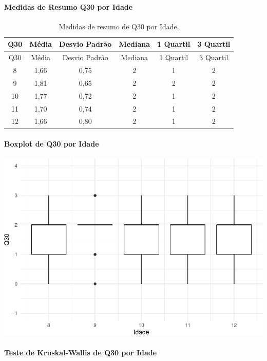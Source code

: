 \documentclass[]{article}
\let\oldparagraph\paragraph
\renewcommand{\paragraph}[1]{\oldparagraph{#1}\mbox{}}
\begin{document}
\cleardoublepage

\hypertarget{medidas-de-resumo-q30-por-idade}{%
\paragraph{Medidas de Resumo Q30 por Idade}\label{medidas-de-resumo-q30-por-idade}}

\begin{longtable}[]{@{}cccccc@{}}
\caption{\label{tab:unnamed-chunk-981}Medidas de resumo de Q30 por Idade.}\tabularnewline
\toprule
Q30 & Média & Desvio Padrão & Mediana & 1 Quartil & 3 Quartil\tabularnewline
\midrule
\endfirsthead
\toprule
Q30 & Média & Desvio Padrão & Mediana & 1 Quartil & 3 Quartil\tabularnewline
\midrule
\endhead
8 & 1,66 & 0,75 & 2 & 1 & 2\tabularnewline
9 & 1,81 & 0,65 & 2 & 2 & 2\tabularnewline
10 & 1,77 & 0,72 & 2 & 1 & 2\tabularnewline
11 & 1,70 & 0,74 & 2 & 1 & 2\tabularnewline
12 & 1,66 & 0,80 & 2 & 1 & 2\tabularnewline
\bottomrule
\end{longtable}

\hypertarget{boxplot-de-q30-por-idade}{%
\paragraph{Boxplot de Q30 por Idade}\label{boxplot-de-q30-por-idade}}

\begin{center}\includegraphics[width=0.75\linewidth]{relatorio_covid19_files/figure-latex/unnamed-chunk-982-1} \end{center}

\hypertarget{teste-de-kruskal-wallis-de-q30-por-idade}{%
\paragraph{Teste de Kruskal-Wallis de Q30 por Idade}\label{teste-de-kruskal-wallis-de-q30-por-idade}}
\end{document}
